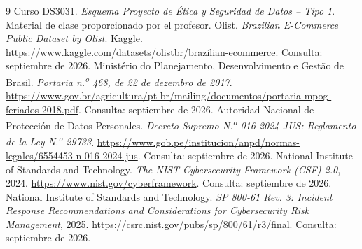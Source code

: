 \documentclass[12pt,a4paper]{article}
\begin{document}
\begin{thebibliography}{9}
 Curso DS3031. \emph{Esquema Proyecto de Ética y Seguridad de Datos -- Tipo 1}. Material de clase proporcionado por el profesor.
 Olist. \emph{Brazilian E-Commerce Public Dataset by Olist}. Kaggle. \url{https://www.kaggle.com/datasets/olistbr/brazilian-ecommerce}. Consulta: septiembre de 2026.
 Ministério do Planejamento, Desenvolvimento e Gestão de Brasil. \emph{Portaria n.\textsuperscript{o} 468, de 22 de dezembro de 2017}. \url{https://www.gov.br/agricultura/pt-br/mailing/documentos/portaria-mpog-feriados-2018.pdf}. Consulta: septiembre de 2026.
 Autoridad Nacional de Protección de Datos Personales. \emph{Decreto Supremo N.\textsuperscript{o} 016-2024-JUS: Reglamento de la Ley N.\textsuperscript{o} 29733}. \url{https://www.gob.pe/institucion/anpd/normas-legales/6554453-n-016-2024-jus}. Consulta: septiembre de 2026.
 National Institute of Standards and Technology. \emph{The NIST Cybersecurity Framework (CSF) 2.0}, 2024. \url{https://www.nist.gov/cyberframework}. Consulta: septiembre de 2026.
 National Institute of Standards and Technology. \emph{SP 800-61 Rev. 3: Incident Response Recommendations and Considerations for Cybersecurity Risk Management}, 2025. \url{https://csrc.nist.gov/pubs/sp/800/61/r3/final}. Consulta: septiembre de 2026.
\end{thebibliography}
\end{document}
